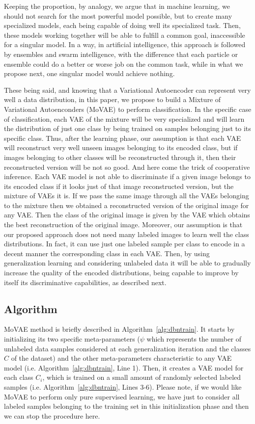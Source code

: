 \documentclass[sigconf,authorversion=true]{aamas}  %
\begin{document}
Keeping the proportion, by analogy, we argue that in machine learning, we should not search for the most powerful model possible, but to create many specialized models, each being capable of doing well its specialized task. Then, these models working together will be able to fulfill a common goal, inaccessible for a singular model. In a way, in artificial intelligence, this approach is followed by ensembles and swarm intelligence, with the difference that each particle or ensemble could do a better or worse job on the common task, while in what we propose next, one singular model would achieve nothing.

These being said, and knowing that a Variational Autoencoder can represent very well a data distribution, in this paper, we propose to build a Mixture of Variational Autoenconders (MoVAE) to perform classification. In the specific case of classification, each VAE of the mixture will be very specialized and will learn the distribution of just one class by being trained on samples belonging just to its specific class. Thus, after the learning phase, our assumption is that each VAE will reconstruct very well unseen images belonging to its encoded class, but if images belonging to other classes will be reconstructed through it, then their reconstructed version will be not so good. And here come the trick of cooperative inference. Each VAE model is not able to discriminate if a given image belongs to its encoded class if it looks just of that image reconstructed version, but the mixture of VAEs it is. If we pass the same image through all the VAEs belonging to the mixture then we obtained a reconstructed version of the original image for any VAE. Then the class of the original image is given by the VAE which obtains the best reconstruction of the original image. Moreover, our assumption is that our proposed approach does not need many labeled images to learn well the class distributions. In fact, it can use just one labeled sample per class to encode in a decent manner the corresponding class in each VAE. Then, by using generalization learning and considering unlabeled data it will be able to gradually increase the quality of the encoded distributions, being capable to improve by itself its discriminative capabilities, as described next.

\subsection{Algorithm}
MoVAE method is briefly described in Algorithm~\ref{alg:dbntrain}. It starts by initializing its two specific meta-parameters ($\psi$ which represents the number of unlabeled data samples considered at each generalization iteration and the classes $C$ of the dataset) and the other meta-parameters characteristic to any VAE model (i.e. Algorithm~\ref{alg:dbntrain}, Line 1). Then, it creates a VAE model for each class $C_i$, which is trained on a small amount of randomly selected labeled samples (i.e. Algorithm~\ref{alg:dbntrain}, Lines 3-6). Please note, if we would like MoVAE to perform only pure supervised learning, we have just to consider all labeled samples belonging to the training set in this initialization phase and then we can stop the procedure here.
\end{document}
